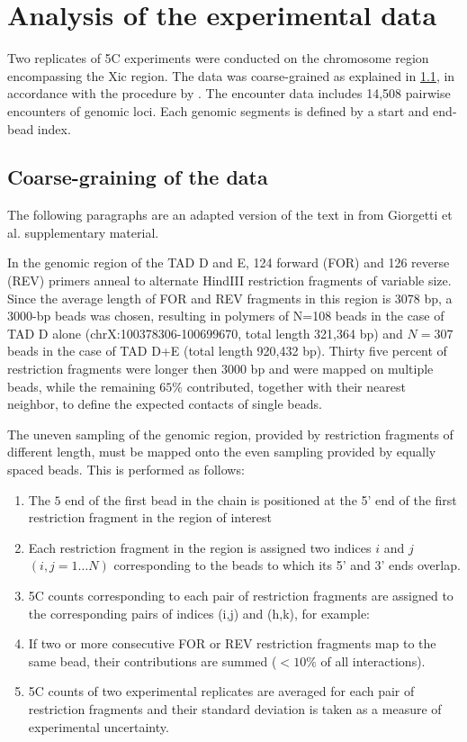 \documentclass[12pt]{book}
\begin{document}
\chapter{Analysis of the experimental data}\label{chapter_AnalysisOfTheExperimentalData}
Two replicates of 5C experiments were conducted on the chromosome region encompassing the Xic region. The data was coarse-grained as explained in \ref{section_coarseGrainingOfEncounterData}, in accordance with the procedure by \cite{giorgetti2014predictive}\cite{nora2012spatial}.
The encounter data includes 14,508 pairwise encounters of genomic loci. Each genomic segments is defined by a start and end-bead index.


\section{Coarse-graining of the data}\label{section_coarseGrainingOfEncounterData}
The following paragraphs are an adapted version of the text in from Giorgetti et al. \cite{giorgetti2014predictive} supplementary material.

In the genomic region of the TAD D and E, 124 forward (FOR) and 126 reverse (REV) primers anneal to alternate HindIII restriction fragments of variable size. 
Since the average length of FOR and REV fragments in this region is 3078 bp, a 3000-bp beads was chosen, resulting in polymers of N=108 beads in the case of TAD D alone (chrX:100378306-100699670, total length 321,364 bp) and $N=307$ beads in the case of TAD D+E (total length 920,432 bp). Thirty five percent of restriction fragments were longer then 3000 bp and were mapped on multiple beads, while the remaining $65\%$ contributed, together with their nearest neighbor, to define the expected contacts of single beads.

The uneven sampling of the genomic region, provided by restriction fragments of different length, must be mapped onto the even sampling provided by equally spaced beads. This is performed as follows\cite{giorgetti2014predictive}:
\begin{enumerate}
 \itemsep1pt  \parskip0pt 
\item The $5$ end of the first bead in the chain is positioned at the 5’ end of the first restriction fragment in the region of interest 
\item Each restriction fragment in the region is assigned two indices $i$ and $j$ $(i,j=1…N)$ corresponding to the beads to which its 5’ and 3’ ends overlap.
\item 5C counts corresponding to each pair of restriction fragments are assigned to the corresponding pairs of indices (i,j) and (h,k), for example:
\item If two or more consecutive FOR or REV restriction fragments map to the same bead, their contributions are summed ($<10\%$ of all interactions).
\item 5C counts of two experimental replicates are averaged for each pair of restriction fragments and their standard deviation is taken as a measure of experimental uncertainty.
\end{enumerate}
\end{document}
